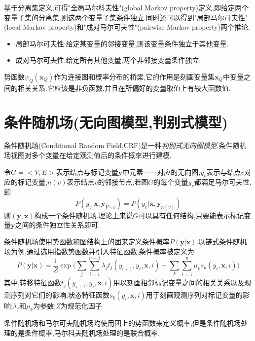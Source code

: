 基于分离集定义,可得"全局马尔科夫性"(global Markov property)定义,即给定两个变量子集的分离集,则这两个变量子集条件独立.同时还可以得到"局部马尔可夫性"(local Markov property)和"成对马尔可夫性"(pairwise Markov property)两个推论.

\begin{itemize}
\item 局部马尔可夫性:给定某变量的邻接变量,则该变量条件独立于其他变量.
\item 成对马尔可夫性:给定所有其他变量,两个非邻接变量条件独立.
\end{itemize}

势函数$\psi_Q(\mathbf x_Q)$作为连接图和概率分布的桥梁,它的作用是刻画变量集$\mathbf x_Q$中变量之间的相关关系.它应该是非负函数,并且在所偏好的变量取值上有较大函数值.

\section{条件随机场(无向图模型,判别式模型)}

条件随机场(Conditional Random Field,CRF)是一种\textit{判别式无向图模型}.条件随机场视图对多个变量在给定观测值后的条件概率进行建模.

令$G=<V,E>$表示结点与标记变量$\mathbf y$中元素一一对应的无向图,$y_v$表示与结点$v$对应的标记变量,$n(v)$表示结点$v$的邻接节点,若图$G$的每个变量$y_v$都满足马尔可夫性,即
\begin{equation}
P(y_v|\mathbf x,\mathbf y_{V\backslash v})=P(y_v|\mathbf x,\mathbf y_{n(v)})
\end{equation}
则$(\mathbf y, \mathbf x)$构成一个条件随机场.理论上来说$G$可以具有任何结构,只要能表示标记变量$\mathbf y$之间的条件独立性关系即可.

条件随机场使用势函数和图结构上的团来定义条件概率$P(\mathbf y|\mathbf x)$.以链式条件随机场为例,通过选用指数势函数并引入特征函数,条件概率被定义为
\begin{equation}
P(\mathbf y|\mathbf x)=\frac{1}{Z}\exp\Big(\sum_j\sum_{i=1}^{n-1}\lambda_jt_j(y_{i+1},y_i,\mathbf x, i)+\sum_k\sum_{i=1}^n\mu_ks_k(y_i,\mathbf x,i)\Big)
\end{equation}
其中,转移特征函数$t_j(y_{i+1},y_i,\mathbf x, i)$用以刻画相邻标记变量之间的相关关系以及观测序列对它们的影响;状态特征函数$s_k(y_i,\mathbf x,i)$用于刻画观测序列对标记变量的影响;$\lambda_j$和$\mu_k$为参数;$Z$为规范化因子.

条件随机场和马尔可夫随机场均使用团上的势函数来定义概率;但是条件随机场处理的是条件概率,马尔科夫随机场处理的是联合概率.

